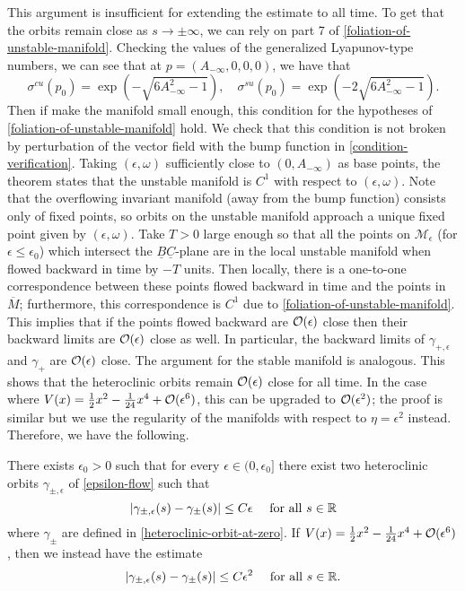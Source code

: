 This argument is insufficient for extending the estimate to all time. To get that the orbits remain close as \(s\to\pm\infty\), we can rely on part 7 of \cref{foliation-of-unstable-manifold}. Checking the values of the generalized Lyapunov-type numbers, we can see that at \(p = (A_{-\infty}, 0, 0, 0)\), we have that
\begin{equation}
	\sigma^{cu}(p_0) = \exp(-\sqrt{6 A_{-\infty}^2 -1}), \quad \sigma^{su}(p_0) = \exp(-2\sqrt{6 A_{-\infty}^2 -1}).
\end{equation}
Then if make the manifold small enough, this condition for the hypotheses of \cref{foliation-of-unstable-manifold} hold. We check that this condition is not broken by perturbation of the vector field with the bump function in \cref{condition-verification}. Taking \((\epsilon, \omega)\) sufficiently close to \((0, A_{-\infty})\) as base points, the theorem states that the unstable manifold is \(C^1\) with respect to \((\epsilon, \omega)\). Note that the overflowing invariant manifold (away from the bump function) consists only of fixed points, so orbits on the unstable manifold approach a unique fixed point given by \((\epsilon, \omega)\). Take \(T> 0\) large enough so that all the points on \(\mathcal M_\epsilon\) (for \(\epsilon \leq \epsilon_0\)) which intersect the \(\underline B \underline C\)-plane are in the local unstable manifold when flowed backward in time by \(-T\) units. Then locally, there is a one-to-one correspondence between these points flowed backward in time and the points in \(\overline M\); furthermore, this correspondence is \(C^1\) due to \cref{foliation-of-unstable-manifold}. This implies that if the points flowed backward are \(\mathcal{O}(\epsilon)\) close then their backward limits are \(\mathcal{O}(\epsilon)\) close as well. In particular, the backward limits of \(\gamma_{+,\epsilon}\) and \(\gamma_+\) are \(\mathcal{O}(\epsilon)\) close. The argument for the stable manifold is analogous. This shows that the heteroclinic orbits remain \(\mathcal{O}(\epsilon)\) close for all time. In the case where \(V(x) = \frac 12 x^2 - \frac 1 {24} x^4 + \mathcal{O}(\epsilon^6)\), this can be upgraded to \(\mathcal{O}(\epsilon^2)\); the proof is similar but we use the regularity of the manifolds with respect to \(\eta = \epsilon^2\) instead. Therefore, we have the following.
\begin{prop}
	There exists \(\epsilon_0 > 0\) such that for every \(\epsilon\in(0,\epsilon_0]\) there exist two heteroclinic orbits \(\gamma_{\pm, \epsilon}\) of \cref{epsilon-flow} such that 
	\begin{equation}
		|\gamma_{\pm,\epsilon}(s) - \gamma_\pm(s) | \leq C \epsilon \quad \text{ for all } s\in \mathbb{R}
	\end{equation}
	where \(\gamma_{\pm}\) are defined in \cref{heteroclinic-orbit-at-zero}. If \(V(x) = \frac 12 x^2 - \frac 1 {24} x^4 + \mathcal{O}(\epsilon^6)\), then we instead have the estimate
	\begin{equation}
		|\gamma_{\pm,\epsilon}(s) - \gamma_\pm(s) | \leq C \epsilon^2 \quad \text{ for all } s\in \mathbb{R}.
	\end{equation}
\end{prop}

